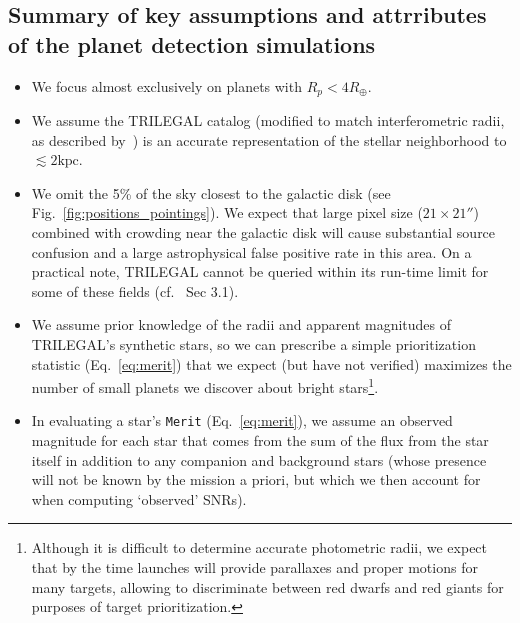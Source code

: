 \subsection{Summary of key assumptions and attrributes of the planet detection simulations}
\label{sec:input_assumptions}
\begin{itemize}
  
	\item We focus almost exclusively on planets with $R_p < 4R_\oplus$.

        \item We assume the TRILEGAL catalog (modified to match
          interferometric radii, as described
          by~) is an accurate representation
          of the stellar neighborhood to $\lesssim2\text{kpc}$.

        \item We omit the 5\% of the sky closest to the galactic disk
          (see Fig.~\ref{fig:positions_pointings}). We expect that
          \tesss large pixel size ($21\times21''$) combined with
          crowding near the galactic disk will cause substantial
          source confusion and a large astrophysical false positive
          rate in this area.  On a practical note, TRILEGAL cannot be
          queried within its run-time limit for some of these fields
          (cf.~ Sec 3.1).
        
	\item We assume prior knowledge of the radii and apparent
          magnitudes of TRILEGAL's synthetic stars, so we can
          prescribe a simple prioritization statistic
          (Eq.~\ref{eq:merit}) that we expect (but have not verified)
          maximizes the number of small planets we discover about
          bright stars\footnote{Although it is difficult to determine
            accurate photometric radii, we expect that by the time
            \tess launches \gaia will provide parallaxes and proper
            motions for many \tess targets, allowing \tess to
            discriminate between red dwarfs and red giants for
            purposes of target prioritization.}.
          
	\item In evaluating a star's \texttt{Merit}
          (Eq.~\ref{eq:merit}), we assume an observed magnitude for
          each star that comes from the sum of the flux from the star
          itself in addition to any companion and background stars
          (whose presence will not be known by the mission a priori,
          but which we then account for when computing `observed'
          SNRs).
          

\end{itemize}
